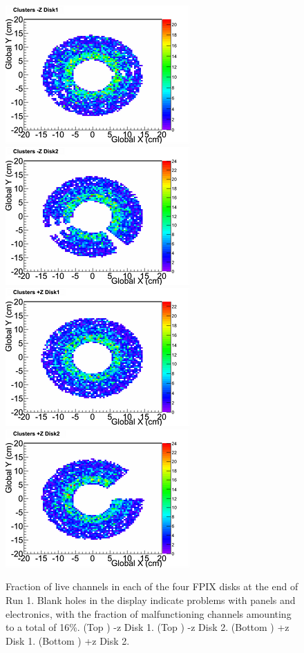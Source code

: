 \begin{figure}[hbtp]
  \begin{center}
    \includegraphics[width=1.0\cmsFigWidth]{figures/FPIX-d1-mz-before}
    \includegraphics[width=1.0\cmsFigWidth]{figures/FPIX-d2-mz-before}
    \includegraphics[width=1.0\cmsFigWidth]{figures/FPIX-d1-pz-before}
    \includegraphics[width=1.0\cmsFigWidth]{figures/FPIX-d2-pz-before}
    \caption{Fraction of live channels in each of the four FPIX disks at the end of Run 1. Blank holes in the display indicate problems with panels and electronics, with the fraction of malfunctioning channels amounting to a total of 16\%. (Top \cmsLeft) -z Disk 1. (Top \cmsRight) -z Disk 2. (Bottom \cmsLeft) +z Disk 1. (Bottom \cmsRight) +z Disk 2.}
    \label{fig:fpix-live-before}
  \end{center}
\end{figure}


